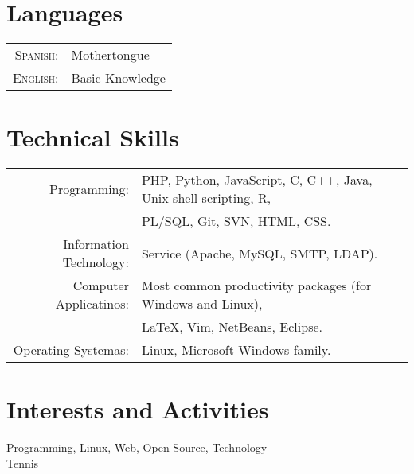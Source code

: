 \documentclass[letter,10pt]{article}
\begin{document}

\section{Languages}
\begin{tabular}{rl}
 \textsc{Spanish:}&Mothertongue\\
\textsc{English:}&Basic Knowledge\\
\end{tabular}

\section{Technical Skills}
\begin{tabular}{rl}
 Programming:& PHP, Python, JavaScript, C, C++, Java, Unix shell scripting, R,\\
 & PL/SQL, Git, SVN, HTML, CSS.\\
 Information Technology:& Service (Apache, MySQL, SMTP, LDAP).\\
 Computer Applicatinos:& Most common productivity packages (for Windows and Linux),\\
 & \LaTeX, Vim, NetBeans, Eclipse.\\
 Operating Systemas:& Linux, Microsoft Windows family.
\end{tabular}

\section{Interests and Activities}
Programming, Linux, Web, Open-Source, Technology\\
Tennis\\

\newpage
\end{document}
